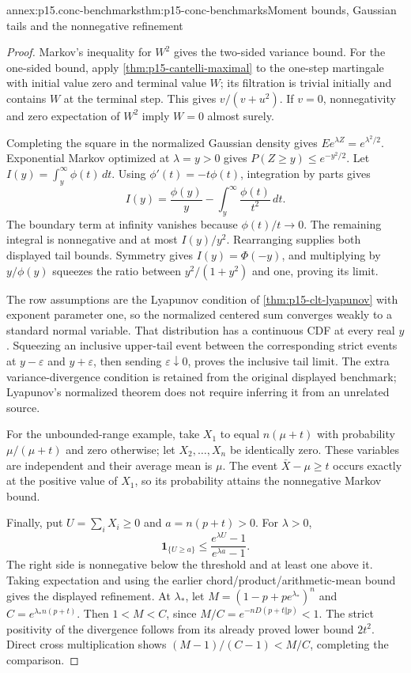 \begin{annexitem}{annex:p15.conc-benchmarks}{thm:p15-conc-benchmarks}{Moment bounds, Gaussian tails and the nonnegative refinement}
\begin{proof}
Markov's inequality for \(W^2\) gives the two-sided
variance bound. For the one-sided bound, apply
\cref{thm:p15-cantelli-maximal} to the one-step martingale
with initial value zero and terminal value \(W\);
its filtration is trivial initially and contains \(W\)
at the terminal step. This gives \(v/(v+u^2)\).
If \(v=0\), nonnegativity and zero expectation of
\(W^2\) imply \(W=0\) almost surely.

Completing the square in the normalized Gaussian density
gives \(Ee^{\lambda Z}=e^{\lambda^2/2}\).
Exponential Markov optimized at \(\lambda=y>0\)
gives \(P(Z\geq y)\leq e^{-y^2/2}\).
Let \(I(y)=\int_y^\infty\phi(t)\,dt\).
Using \(\phi'(t)=-t\phi(t)\), integration by parts gives
\[
 I(y)=\frac{\phi(y)}y-\int_y^\infty\frac{\phi(t)}{t^2}\,dt.
\]
The boundary term at infinity vanishes because
\(\phi(t)/t\to0\). The remaining integral is nonnegative
and at most \(I(y)/y^2\). Rearranging supplies both
displayed tail bounds. Symmetry gives \(I(y)=\Phi(-y)\),
and multiplying by \(y/\phi(y)\) squeezes the ratio
between \(y^2/(1+y^2)\) and one, proving its limit.

The row assumptions are the Lyapunov condition of
\cref{thm:p15-clt-lyapunov} with exponent parameter one,
so the normalized centered sum converges weakly to a
standard normal variable. That distribution has a
continuous CDF at every real \(y\). Squeezing an
inclusive upper-tail event between the corresponding
strict events at \(y-\varepsilon\) and \(y+\varepsilon\),
then sending \(\varepsilon\downarrow0\), proves the
inclusive tail limit. The extra variance-divergence
condition is retained from the original displayed
benchmark; Lyapunov's normalized theorem does not
require inferring it from an unrelated source.

For the unbounded-range example, take \(X_1\) to equal
\(n(\mu+t)\) with probability \(\mu/(\mu+t)\) and zero
otherwise; let \(X_2,\ldots,X_n\) be identically zero.
These variables are independent and their average
mean is \(\mu\). The event \(\bar X-\mu\geq t\)
occurs exactly at the positive value of \(X_1\), so
its probability attains the nonnegative Markov bound.

Finally, put \(U=\sum_iX_i\geq0\) and \(a=n(p+t)>0\).
For \(\lambda>0\),
\[
       \mathbf1_{\{U\geq a\}}
            \leq\frac{e^{\lambda U}-1}{e^{\lambda a}-1}.
\]
The right side is nonnegative below the threshold
and at least one above it. Taking expectation and
using the earlier chord/product/arithmetic-mean bound
gives the displayed refinement.
At \(\lambda_*\), let \(M=(1-p+pe^{\lambda_*})^n\)
and \(C=e^{\lambda_*n(p+t)}\). Then
\(1<M<C\), since \(M/C=e^{-nD(p+t\Vert p)}<1\).
The strict positivity of the divergence follows
from its already proved lower bound \(2t^2\).
Direct cross multiplication shows
\((M-1)/(C-1)<M/C\), completing the comparison.
\end{proof}
\end{annexitem}

